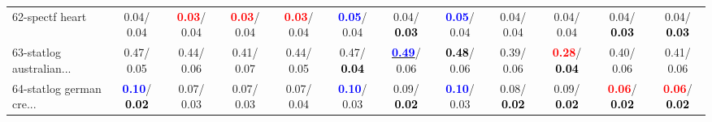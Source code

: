 \begin{table}[h]
\begin{center}
{\begin{tabular}{lc|c|c|c|c|c|c|c|c|c|c}
62-spectf heart &   0.04/  0.04 & \textcolor{red}{\textbf{  0.03}}/  0.04 & \textcolor{red}{\textbf{  0.03}}/  0.04 & \textcolor{red}{\textbf{  0.03}}/  0.04 & \textcolor{blue}{\textbf{  0.05}}/  0.04 &   0.04/\textcolor{black}{\textbf{  0.03}} & \textcolor{blue}{\textbf{  0.05}}/  0.04 &   0.04/  0.04 &   0.04/  0.04 &   0.04/\textcolor{black}{\textbf{  0.03}} &   0.04/\textcolor{black}{\textbf{  0.03}} \\
63-statlog australian... &   0.47/  0.05 &   0.44/  0.06 &   0.41/  0.07 &   0.44/  0.05 &   0.47/\textcolor{black}{\textbf{  0.04}} & \underline{\textcolor{blue}{\textbf{  0.49}}}/  0.06 & \textcolor{black}{\textbf{  0.48}}/  0.06 &   0.39/  0.06 & \textcolor{red}{\textbf{  0.28}}/\textcolor{black}{\textbf{  0.04}} &   0.40/  0.06 &   0.41/  0.06 \\
64-statlog german cre... & \textcolor{blue}{\textbf{  0.10}}/\textcolor{black}{\textbf{  0.02}} &   0.07/  0.03 &   0.07/  0.03 &   0.07/  0.04 & \textcolor{blue}{\textbf{  0.10}}/  0.03 &   0.09/\textcolor{black}{\textbf{  0.02}} & \textcolor{blue}{\textbf{  0.10}}/  0.03 &   0.08/\textcolor{black}{\textbf{  0.02}} &   0.09/\textcolor{black}{\textbf{  0.02}} & \textcolor{red}{\textbf{  0.06}}/\textcolor{black}{\textbf{  0.02}} & \textcolor{red}{\textbf{  0.06}}/\textcolor{black}{\textbf{  0.02}} \\\end{tabular}
}\label{strats1bCIELM}
\end{center}
\end{table}
